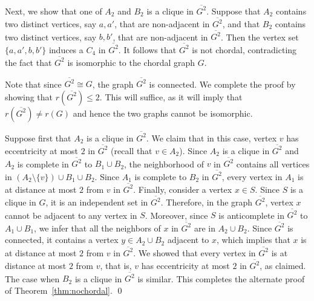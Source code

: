 \documentclass[12pt]{article}
\newcommand{\sq}[1]{\overline{#1^2}}
\begin{document}
Next, we show that one of $A_2$ and $B_2$ is a clique in $\sq{G}$. 
Suppose that $A_2$ contains two distinct vertices, say $a,a'$, that are non-adjacent in $\sq{G}$, and that $B_2$ contains two distinct vertices, say $b,b'$, that are non-adjacent in $\sq{G}$.  
Then the vertex set $\{a,a',b,b'\}$ induces a $C_4$ in $\sq{G}$.
It follows that $\sq{G}$ is not chordal, contradicting the fact that $\sq{G}$ is isomorphic to the chordal graph $G$.

Note that since $\sq{G}\cong G$, the graph $\sq{G}$ is connected.  
We complete the proof by showing that $r(\sq{G}) \le 2$.  
This will suffice, as it will imply that $r(\sq{G}) \neq r(G)$ and hence the two graphs cannot be isomorphic.

Suppose first that $A_2$ is a clique in $\sq{G}$.  
We claim that in this case, vertex $v$ has eccentricity at most $2$ in $\sq{G}$ (recall that $v\in A_2$).  
Since $A_2$ is a clique in $\sq{G}$ and $A_2$ is complete in $\sq{G}$ to $B_1\cup B_2$, the neighborhood of $v$ in $\sq{G}$ contains all vertices in $(A_2\setminus \{v\})\cup B_1\cup B_2$.  
Since $A_1$ is complete to $B_2$ in $\sq{G}$, every vertex in $A_1$ is at distance at most $2$ from $v$ in $\sq{G}$.  
Finally, consider a vertex $x\in S$.  
Since $S$ is a clique in $G$, it is an independent set in $\sq{G}$.
Therefore, in the graph $\sq{G}$, vertex $x$ cannot be adjacent to any vertex in $S$.  
Moreover, since $S$ is anticomplete in $\sq{G}$ to $A_1\cup B_1$, we infer that all the neighbors of $x$ in $\sq{G}$ are in
$A_2\cup B_2$.  
Since $\sq{G}$ is connected, it contains a vertex $y\in A_2\cup B_2$ adjacent to $x$, which implies that $x$ is
at distance at most $2$ from $v$ in $\sq{G}$.  
We showed that every vertex in $\sq{G}$ is at distance at most $2$ from $v$, that is, $v$ has eccentricity at most $2$ in $\sq{G}$, as claimed.  
The case when $B_2$ is a clique in $\sq{G}$ is similar.  
This completes the alternate proof of Theorem~\ref{thm:nochordal}. \qed

 
 
\end{document}
